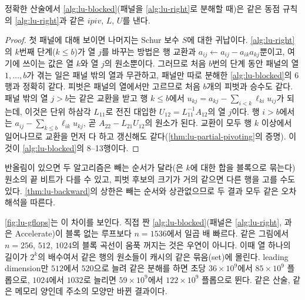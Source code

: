 \begin{proposition}
\label{prop:lu-blocked-same}
정확한 산술에서 \cref{alg:lu-blocked}(패널을 \cref{alg:lu-right}로 분해할 때)은 같은 동점 규칙의 \cref{alg:lu-right}과 같은 $\mathit{ipiv}$, $L$, $U$를 낸다.
\end{proposition}

\begin{proof}
첫 패널에 대해 보이면 나머지는 Schur 보수 $S$에 대한 귀납이다. \cref{alg:lu-right}의 $k$번째 단계($k\le b$)가 열 $j$를 바꾸는 방법은 행 교환과 $a_{ij}\gets a_{ij}-a_{ik}a_{kj}$뿐이고, 여기에 쓰이는 값은 열 $k$와 열 $j$의 원소뿐이다. 그러므로 처음 $b$번의 단계 동안 패널의 열 $1,\dots,b$가 겪는 일은 패널 밖의 열과 무관하고, 패널만 따로 분해한 \cref{alg:lu-blocked}의 6행과 정확히 같다. 피벗은 패널의 열에서만 고르므로 처음 $b$개의 피벗과 승수도 같다. 패널 밖의 열 $j>b$는 같은 교환을 받고 행 $k\le b$에서 $u_{kj}=a_{kj}-\sum_{i<k}\ell_{ki}u_{ij}$가 되는데, 이것은 단위 하삼각 $L_{11}$로 전진 대입한 $U_{12}=L_{11}^{-1}A_{12}$의 열 $j$이다. 행 $i>b$에서는 $a_{ij}-\sum_{k\le b}\ell_{ik}u_{kj}$, 곧 $A_{22}-L_{21}U_{12}$의 원소가 된다. 교환이 모두 행 $k$ 이상에서 일어나므로 교환을 먼저 다 하고 갱신해도 같다(\cref{thm:lu-partial-pivoting}의 증명). 이것이 \cref{alg:lu-blocked}의 8--13행이다.
\end{proof}

반올림이 있으면 두 알고리즘은 빼는 순서가 달라(은 $k$에 대한 합을 블록으로 묶는다) 원소의 끝 비트가 다를 수 있고, 피벗 후보의 크기가 거의 같으면 다른 행을 고를 수도 있다. \cref{thm:lu-backward}의 상한은 빼는 순서와 상관없으므로 두 결과 모두 같은 오차 해석을 따른다.

\cref{fig:lu-gflops}는 이 차이를 보인다. 직접 짠 \cref{alg:lu-blocked}(패널은 \cref{alg:lu-right}, 과 은 Accelerate)이 블록 없는 루프보다 $n=1536$에서 일곱 배 빠르다. 같은 그림에서 $n=256$, $512$, $1024$의 블록 곡선이 움푹 꺼지는 것은 우연이 아니다. 이때 열 하나의 길이가 $2^{k}$의 배수여서 같은 행의 원소들이 캐시의 같은 묶음(set)에 몰린다. leading dimension만 $512$에서 $520$으로 늘려 같은 분해를 하면 초당 $36\times10^9$에서 $85\times10^9$ 플롭으로, $1024$에서 $1032$로 늘리면 $59\times10^9$에서 $122\times10^9$ 플롭으로 뛴다. 같은 산술, 같은 메모리 양인데 주소의 모양만 바뀐 결과이다.


